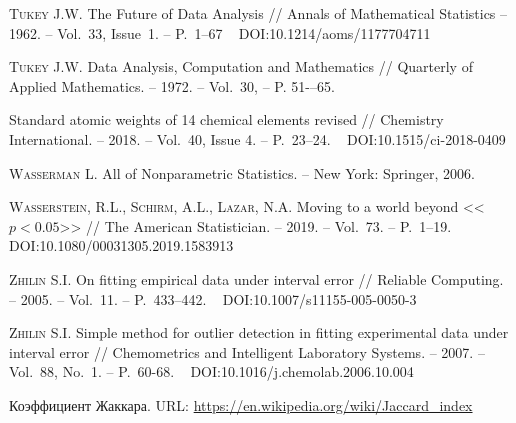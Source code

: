 \documentclass[a5paper,openany]{book}
\newcommand{\electronicbook}{}%
\newcommand{\doi}[1]{
    \ifdefined\electronicbook
        DOI:#1
    \fi}%
\begin{document}
\begin{thebibliography}{999}
\textsc{Tukey J.W.} The Future of Data Analysis // 
Annals of Mathematical Statistics -- 1962. -- Vol.~33, Issue~1. -- P.~1--67 \  
\doi{10.1214/aoms/1177704711} 

\textsc{Tukey J.W.} Data Analysis, Computation and Mathematics //
Quarterly of Applied Mathematics. -- 1972. -- Vol.~30, -- P. 51-–65.

Standard atomic weights of 14 chemical elements revised // Chemistry International. 
-- 2018. -- Vol.~40, Issue 4. -- P.~23--24. \  \doi{10.1515/ci-2018-0409} 
    
\textsc{Wasserman L.} All of Nonparametric Statistics. -- New York: Springer, 2006. 
  
\textsc{Wasserstein, R.L.,  Schirm, A.L., Lazar, N.A.} Moving to a world beyond 
<<$p < 0.05$>> // The American Statistician. -- 2019. -- Vol.~73. -- P.~1--19. \   
\doi{10.1080/00031305.2019.1583913} 
  
  
\textsc{Zhilin S.I.} On fitting empirical data under interval error // 
Reliable Computing. -- 2005. -- Vol.~11. -- P.~433--442. \ 
\doi{10.1007/s11155-005-0050-3}  
  
\bibitem{Zhilin2007}  
\textsc{Zhilin S.I.} Simple method for outlier detection in fitting experimental data 
under interval error // Chemometrics and Intelligent Laboratory Systems. -- 2007. 
-- Vol.~88, No.~1. -- P.~60-68. \  
\doi{10.1016/j.chemolab.2006.10.004}  
  
\bibitem{Jaccard}  Коэффициент Жаккара. 
URL: \url{https://en.wikipedia.org/wiki/Jaccard_index} 
  
\end{thebibliography} 
  
  
\end{document}
